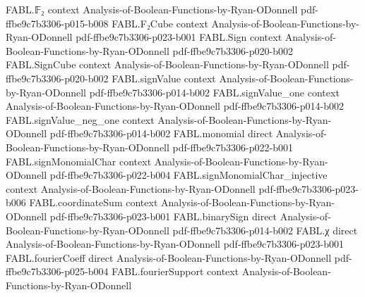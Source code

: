 \begin{theorem}
\label{FABL.RandomizedDecisionTree.symmetrization_queryProbability_eq_averageCost_div}
\leanok
{}
\proofstep
  {FABL.𝔽₂}
  {context}
  {Analysis-of-Boolean-Functions-by-Ryan-ODonnell}
  {pdf-ffbe9c7b3306-p015-b008}
\proofstep
  {FABL.F₂Cube}
  {context}
  {Analysis-of-Boolean-Functions-by-Ryan-ODonnell}
  {pdf-ffbe9c7b3306-p023-b001}
\proofstep
  {FABL.Sign}
  {context}
  {Analysis-of-Boolean-Functions-by-Ryan-ODonnell}
  {pdf-ffbe9c7b3306-p020-b002}
\proofstep
  {FABL.SignCube}
  {context}
  {Analysis-of-Boolean-Functions-by-Ryan-ODonnell}
  {pdf-ffbe9c7b3306-p020-b002}
\proofstep
  {FABL.signValue}
  {context}
  {Analysis-of-Boolean-Functions-by-Ryan-ODonnell}
  {pdf-ffbe9c7b3306-p014-b002}
\proofstep
  {FABL.signValue_one}
  {context}
  {Analysis-of-Boolean-Functions-by-Ryan-ODonnell}
  {pdf-ffbe9c7b3306-p014-b002}
\proofstep
  {FABL.signValue_neg_one}
  {context}
  {Analysis-of-Boolean-Functions-by-Ryan-ODonnell}
  {pdf-ffbe9c7b3306-p014-b002}
\proofstep
  {FABL.monomial}
  {direct}
  {Analysis-of-Boolean-Functions-by-Ryan-ODonnell}
  {pdf-ffbe9c7b3306-p022-b001}
\proofstep
  {FABL.signMonomialChar}
  {context}
  {Analysis-of-Boolean-Functions-by-Ryan-ODonnell}
  {pdf-ffbe9c7b3306-p022-b004}
\proofstep
  {FABL.signMonomialChar_injective}
  {context}
  {Analysis-of-Boolean-Functions-by-Ryan-ODonnell}
  {pdf-ffbe9c7b3306-p023-b006}
\proofstep
  {FABL.coordinateSum}
  {context}
  {Analysis-of-Boolean-Functions-by-Ryan-ODonnell}
  {pdf-ffbe9c7b3306-p023-b001}
\proofstep
  {FABL.binarySign}
  {direct}
  {Analysis-of-Boolean-Functions-by-Ryan-ODonnell}
  {pdf-ffbe9c7b3306-p014-b002}
\proofstep
  {FABL.χ}
  {direct}
  {Analysis-of-Boolean-Functions-by-Ryan-ODonnell}
  {pdf-ffbe9c7b3306-p023-b001}
\proofstep
  {FABL.fourierCoeff}
  {direct}
  {Analysis-of-Boolean-Functions-by-Ryan-ODonnell}
  {pdf-ffbe9c7b3306-p025-b004}
\proofstep
  {FABL.fourierSupport}
  {context}
  {Analysis-of-Boolean-Functions-by-Ryan-ODonnell}

\end{theorem}
